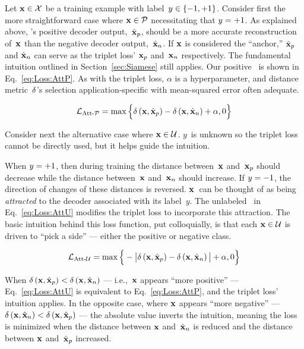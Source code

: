 Let $\mathbf{x}\in\mathcal{X}$ be a training example with label~${y\in\{-1,+1\}}$. Consider first the more straightforward case where ${\mathbf{x}\in\mathcal{P}}$ necessitating that ${y=+1}$.  As explained above, \toolname's positive decoder output,~$\hat{\mathbf{x}}_{p}$, should be a more accurate reconstruction of~$\mathbf{x}$ than the negative decoder output,~$\hat{\mathbf{x}}_{n}$. If $\mathbf{x}$ is considered the ``anchor,'' $\hat{\mathbf{x}}_{p}$ and $\hat{\mathbf{x}}_{n}$ can serve as the triplet loss' $\mathbf{x}_{p}$ and~$\mathbf{x}_{n}$ respectively. The fundamental intuition outlined in Section~\ref{sec:Siamese} still applies.  Our positive \attLossLow\ is shown in Eq.~\eqref{eq:Loss:AttP}.  As with the triplet loss, $\alpha$ is a hyperparameter, and distance metric~$\delta$'s selection application-specific with mean-squared error often adequate.

\begin{equation}\label{eq:Loss:AttP}
  \mathcal{L}_{\text{Att-}\mathcal{P}} = \max\Big\{ \delta\left(\mathbf{x}, \hat{\mathbf{x}}_{p}\right) - \delta\left(\mathbf{x}, \hat{\mathbf{x}}_{n}\right) + \alpha, 0 \Big\}
\end{equation}

Consider next the alternative case where ${\mathbf{x}\in\mathcal{U}}$. $y$~is unknown so the triplet loss cannot be directly used, but it helps guide the intuition.

When ${y=+1}$, then during training the distance between~$\mathbf{x}$ and~$\mathbf{x}_{p}$ should decrease while the distance between~$\mathbf{x}$ and~$\mathbf{x}_{n}$ should increase.  If ${y=-1}$, the direction of changes of these distances is reversed.  $\mathbf{x}$~can be thought of as being \textit{attracted} to the decoder associated with its label~$y$. The unlabeled \attLossLow\ in Eq.~\ref{eq:Loss:AttU} modifies the triplet loss to incorporate this attraction.  The basic intuition behind this loss function, put colloquially, is that each ${\mathbf{x}\in\mathcal{U}}$ is driven to ``pick a side'' --- either the positive or negative class.

\begin{equation}\label{eq:Loss:AttU}
  \mathcal{L}_{\text{Att-}\mathcal{U}} = \max\Big\{ - \big\lvert\delta\left(\mathbf{x}, \hat{\mathbf{x}}_{p}\right) - \delta\left(\mathbf{x}, \hat{\mathbf{x}}_{n}\right)\big\rvert + \alpha, 0 \Big\}
\end{equation}

When ${\delta\left(\mathbf{x}, \hat{\mathbf{x}}_{p}\right) < \delta\left(\mathbf{x}, \hat{\mathbf{x}}_{n}\right)}$ --- i.e.,~$\mathbf{x}$ appears ``more positive'' --- Eq.~\eqref{eq:Loss:AttU} is equivalent to Eq.~\eqref{eq:Loss:AttP}, and the triplet loss' intuition applies. In the opposite case, where $\mathbf{x}$ appears ``more negative'' --- ${\delta\left(\mathbf{x}, \hat{\mathbf{x}}_{n}\right) < \delta\left(\mathbf{x}, \hat{\mathbf{x}}_{p}\right)}$ --- the absolute value inverts the intuition, meaning the loss is minimized when the distance between $\mathbf{x}$ and~$\hat{\mathbf{x}}_{n}$ is reduced and the distance between $\mathbf{x}$ and~$\hat{\mathbf{x}}_{p}$ increased.

